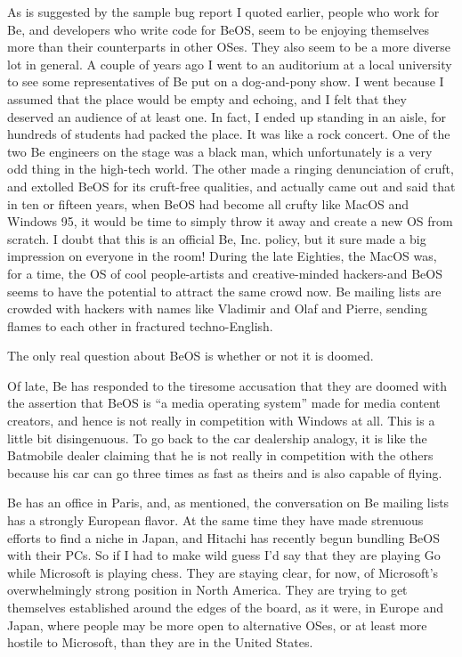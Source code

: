 \documentclass[
  fontsize=11pt,
  paper=landscape,
  twocolumn=true,
  pagesize=pdftex,
  headings=small,
  DIV=15,
  ]{scrartcl}
\begin{document}
As is suggested by the sample bug report I quoted earlier, people who
work for Be, and developers who write code for BeOS, seem to be enjoying
themselves more than their counterparts in other OSes. They also seem to
be a more diverse lot in general. A couple of years ago I went to an
auditorium at a local university to see some representatives of Be put
on a dog-and-pony show. I went because I assumed that the place would be
empty and echoing, and I felt that they deserved an audience of at least
one. In fact, I ended up standing in an aisle, for hundreds of students
had packed the place. It was like a rock concert. One of the two Be
engineers on the stage was a black man, which unfortunately is a very
odd thing in the high-tech world. The other made a ringing denunciation
of cruft, and extolled BeOS for its cruft-free qualities, and actually
came out and said that in ten or fifteen years, when BeOS had become all
crufty like MacOS and Windows 95, it would be time to simply throw it
away and create a new OS from scratch. I doubt that this is an official
Be, Inc. policy, but it sure made a big impression on everyone in the
room! During the late Eighties, the MacOS was, for a time, the OS of
cool people-artists and creative-minded hackers-and BeOS seems to have
the potential to attract the same crowd now. Be mailing lists are
crowded with hackers with names like Vladimir and Olaf and Pierre,
sending flames to each other in fractured techno-English.

The only real question about BeOS is whether or not it is doomed.

Of late, Be has responded to the tiresome accusation that they are
doomed with the assertion that BeOS is ``a media operating system'' made
for media content creators, and hence is not really in competition with
Windows at all. This is a little bit disingenuous. To go back to the car
dealership analogy, it is like the Batmobile dealer claiming that he is
not really in competition with the others because his car can go three
times as fast as theirs and is also capable of flying.

Be has an office in Paris, and, as mentioned, the conversation on Be
mailing lists has a strongly European flavor. At the same time they have
made strenuous efforts to find a niche in Japan, and Hitachi has
recently begun bundling BeOS with their PCs. So if I had to make wild
guess I'd say that they are playing Go while Microsoft is playing chess.
They are staying clear, for now, of Microsoft's overwhelmingly strong
position in North America. They are trying to get themselves established
around the edges of the board, as it were, in Europe and Japan, where
people may be more open to alternative OSes, or at least more hostile to
Microsoft, than they are in the United States.
\end{document}
